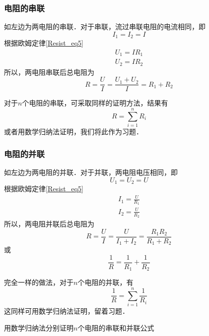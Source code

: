 
\begin{issues}
\end{issues}

\subsubsection{电阻的串联}
如左边为两电阻的串联．对于串联，流过串联电阻的电流相同，即
\begin{equation}
I_1=I_2=I
\end{equation}
根据欧姆定律\autoref{Resist_eq5}~
\begin{equation}
\begin{aligned}
U_1=IR_1\\
U_2=IR_2
\end{aligned}
\end{equation}
所以，两电阻串联后总电阻为
\begin{equation}
R = \frac{U}{I}=\frac{U_1+U_2}{I} = {R_1 + R_2}
\end{equation}

对于$n$个电阻的串联，可采取同样的证明方法，结果有
\begin{equation}
R=\sum_{i=1}^{n}R_i
\end{equation}
或者用数学归纳法证明，我们将此作为习题．
\subsubsection{电阻的并联}
如左边为两电阻的并联．对于并联，两电阻电压相同，即
\begin{equation}
U_1=U_2=U
\end{equation}
根据欧姆定律\autoref{Resist_eq5}~
\begin{equation}
\begin{aligned}
I_1=\frac{U}{R_1}\\
I_2=\frac{U}{R_2}
\end{aligned}
\end{equation}
所以，两电阻并联后总电阻为
\begin{equation}
R = \frac{U}{I}=\frac{U}{I_1+I_2} =\frac{R_1R_2} {R_1 + R_2}
\end{equation}
或
\begin{equation}
\frac{1}{R} = \frac{1} {R_1}+\frac{1}{R_2}
\end{equation}

完全一样的做法，对于$n$个电阻的并联，有
\begin{equation}
\frac{1}{R}=\sum_{i=1}^{n}\frac{1}{R_i}
\end{equation}
这同样可用数学归纳法证明，留着习题．
\begin{exercise}{}
用数学归纳法分别证明$n$个电阻的串联和并联公式
\end{exercise}
